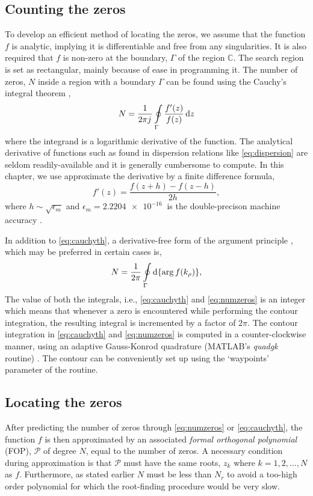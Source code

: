 \documentclass[11pt]{article}
\begin{document}
\subsection{Counting the zeros}
%
To develop an efficient method of locating the zeros, we assume that the function $f$ is analytic, implying it is differentiable and free from any singularities. It is also required that $f$ is non-zero at the boundary, $\Gamma$ of the region $\mathbb{C}$. The search region is set as rectangular, mainly because of ease in programming it. The number of zeros, $N$ inside a region with a boundary $\Gamma$ can be found using the Cauchy's integral theorem \cite[pg. 71]{Krantz1999,Delves1967c},
%
\begin{equation}
  N = \frac{1}{2 \pi j\mkern1mu} \oint \limits_{\Gamma} \frac{f'(z)}{f(z)} \mathop{}\!\mathrm{d}{z}
  \label{eq:cauchyth}
\end{equation}
%
where the integrand is a logarithmic derivative of the function. The analytical derivative of functions such as found in dispersion relations like \eqref{eq:dispersion} are seldom readily-available and it is generally cumbersome to compute. In this chapter, we use approximate the derivative by a finite difference formula,
%
\begin{equation}
  f'(z) = \frac{f(z + h) - f(z - h)}{2 h},
  \label{eq:FD}
\end{equation}
%
where $h \sim \sqrt{\epsilon_m}$ and $\epsilon_m = \SI{2.2204e-16}{}$ is the double-precison machine accuracy \cite[pg. 230]{press2007numerical}.

In addition to \eqref{eq:cauchyth}, a derivative-free form of the argument principle \cite{Carpentier1982c,Gillan2006c}, which may be preferred in certain cases is,
%
\begin{equation}
 N = \frac{1}{2 \pi} \oint \limits_{\Gamma} \mathop{}\!\mathrm{d} {\{ \arg f(k_{\rho})\}},
 \label{eq:numzeros}
\end{equation}
%
The value of both the integrals, i.e., \eqref{eq:cauchyth} and \eqref{eq:numzeros} is an integer which means that whenever a zero is encountered while performing the contour integration, the resulting integral is incremented by a factor of $2 \pi$. The contour integration in \eqref{eq:cauchyth} and \eqref{eq:numzeros} is computed in a counter-clockwise manner, using an adaptive Gauss-Konrod quadrature ({MATLAB}'s \emph{quadgk} routine) \cite{Shampine2008}. The contour can be conveniently set up using the `waypoints' parameter of the routine.
\subsection{Locating the zeros}
%
After predicting the number of zeros through \eqref{eq:numzeros} or \eqref{eq:cauchyth}, the function $f$ is then approximated by an associated \emph{formal orthogonal polynomial} (FOP), $\mathcal P$ of degree $N$, equal to the number of zeros. A necessary condition during approximation is that $\mathcal P$ must have the same roots, $z_k$ where $k = 1,2,...,N$ as $f$. Furthermore, as stated earlier $N$ must be less than $N_r$ to avoid a too-high order polynomial for which the root-finding procedure would be very slow.
\end{document}
